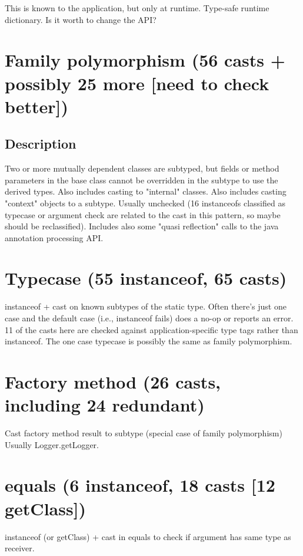 This is known to the application, but only at runtime.
Type-safe runtime dictionary. 
Is it worth to change the API? 

\section{Family polymorphism (56 casts + possibly 25 more [need to check better])}
\label{sec:orga7c8f3e}

\subsection{Description}
\label{sec:orgca82bb4}

Two or more mutually dependent classes are subtyped, but fields or method parameters in the base class cannot be overridden in the subtype to use the derived types. 
Also includes casting to "internal" classes. 
Also includes casting "context" objects to a subtype. 
Usually unchecked (16 instanceofs classified as typecase or argument check are related to the cast in this pattern, so maybe should be reclassified). 
Includes also some "quasi reflection" calls to the java annotation processing API. 

\section{Typecase (55 instanceof, 65 casts)}
\label{sec:org02d1e7e}

instanceof + cast on known subtypes of the static type. 
Often there's just one case and the default case (i.e., instanceof fails) does a no-op or reports an error. 
11 of the casts here are checked against application-specific type tags rather than instanceof. 
The one case typecase is possibly the same as family polymorphism. 

\section{Factory method (26 casts, including 24 redundant)}
\label{sec:org875caac}

Cast factory method result to subtype (special case of family polymorphism) 
Usually Logger.getLogger. 

\section{equals (6 instanceof, 18 casts [12 getClass])}
\label{sec:orgf000ab3}
instanceof (or getClass) + cast in equals to check if argument has same type as receiver. 

